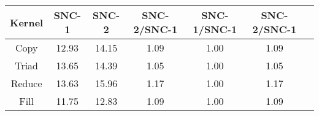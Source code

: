 \begin{tabular}{|c|c|c|c|c|c|c|}  \hline
Kernel&SNC-1&SNC-2 & SNC-2/SNC-1 & SNC-1/SNC-1 & SNC-2/SNC-1 \\ \hline 
Copy & 12.93 & 14.15  & 1.09 & 1.00 & 1.09 \\ \hline 
Triad & 13.65 & 14.39  & 1.05 & 1.00 & 1.05 \\ \hline 
Reduce & 13.63 & 15.96  & 1.17 & 1.00 & 1.17 \\ \hline 
Fill & 11.75 & 12.83  & 1.09 & 1.00 & 1.09 \\ \hline 
\end{tabular}
